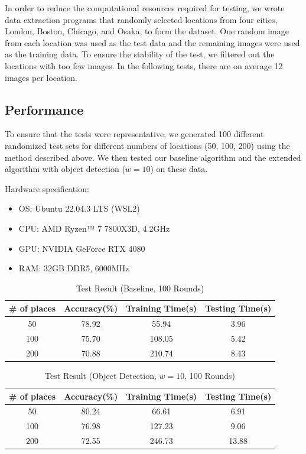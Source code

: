 \documentclass[conference]{IEEEtran}
\begin{document}
In order to reduce the computational resources required for testing, we wrote data extraction programs that randomly selected locations from four cities, London, Boston, Chicago, and Osaka, to form the dataset. One random image from each location was used as the test data and the remaining images were used as the training data. To ensure the stability of the test, we filtered out the locations with too few images. In the following tests, there are on average 12 images per location.

\subsection{Performance}

To ensure that the tests were representative, we generated 100 different randomized test sets for different numbers of locations (50, 100, 200) using the method described above. We then tested our baseline algorithm and the extended algorithm with object detection ($w = 10$) on these data.

Hardware specification:

\begin{itemize}
    \item OS: Ubuntu 22.04.3 LTS (WSL2)
    \item CPU: AMD Ryzen™ 7 7800X3D, 4.2GHz
    \item GPU: NVIDIA GeForce RTX 4080
    \item RAM: 32GB DDR5, 6000MHz
\end{itemize}

\begin{table}[ht]
    \centering
    \caption{Test Result (Baseline, 100 Rounds)}
    \begin{tabular}{|c|c|c|c|}
    \hline \textbf{\# of places} & \textbf{Accuracy(\%)} & \textbf{Training Time(s)} & \textbf{Testing Time(s)}\\
    \hline 50 & 78.92 & 55.94 & 3.96\\
    \hline 100 & 75.70 & 108.05 & 5.42\\
    \hline 200 & 70.88 & 210.74 & 8.43\\
    \hline
    \end{tabular}
\end{table}

\begin{table}[ht]
    \centering
    \caption{Test Result (Object Detection, $w = 10$, 100 Rounds)}
    \begin{tabular}{|c|c|c|c|}
    \hline \textbf{\# of places} & \textbf{Accuracy(\%)} & \textbf{Training Time(s)} & \textbf{Testing Time(s)}\\
    \hline 50 & 80.24 & 66.61 & 6.91\\
    \hline 100 & 76.98 & 127.23 & 9.06\\
    \hline 200 & 72.55 & 246.73 & 13.88\\
    \hline
    \end{tabular}
\end{table}
\end{document}
